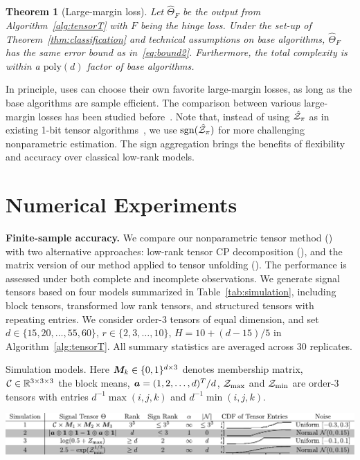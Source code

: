 \documentclass{article}
\theoremstyle{plain}
\newtheorem{thm}{Theorem}
\theoremstyle{definition}
\def\sign{\textup{sgn}}
\def\CPT{\text{\bf \footnotesize CPT}}
\def\NonParaM{\text{\bf \footnotesize NonparaM}}
\def\NonParaT{\text{\bf \footnotesize NonparaT}}
\begin{document}
\begin{thm}[Large-margin loss] Let $\hat \Theta_F$ be the output from Algorithm~\ref{alg:tensorT} with $F$ being the hinge loss. Under the set-up of Theorem~\ref{thm:classification} and technical assumptions on base algorithms, $\hat \Theta_F$ has the same error bound as in~\eqref{eq:bound2}. Furthermore, the total complexity is within a $\text{poly}(d)$ factor of base algorithms. 
\end{thm}
In principle, uses can choose their own favorite large-margin losses, as long as the base algorithms are sample efficient. The comparison between various large-margin losses has been studied before~\cite{bartlett2006convexity}. Note that, instead of using $\hat {\mathcal{Z}}_\pi$ as in existing 1-bit tensor algorithms~\cite{ghadermarzy2018learning,wang2018learning}, we use $\sign(\hat \tZ_\pi)$ for more challenging nonparametric estimation. The sign aggregation brings the benefits of flexibility and accuracy over classical low-rank models. 

\vspace{-.1cm}
\section{Numerical Experiments}\label{sec:simulation}
\vspace{-.2cm}

{\bf Finite-sample accuracy.} We compare our nonparametric tensor method (\NonParaT) with two alternative approaches: low-rank tensor CP decomposition (\CPT), and the matrix version of our method applied to tensor unfolding (\NonParaM). The performance is assessed under both complete and incomplete observations.  We generate signal tensors based on four models summarized in Table~\ref{tab:simulation}, including block tensors, transformed low rank tensors, and structured tensors with repeating entries. We consider order-3  tensors of equal dimension, and set $d\in \{15, 20,\ldots,55,60\}$, $r\in\{2,3,\ldots,10\}$, $H=10+{(d-15)/ 5}$ in Algorithm~\ref{alg:tensorT}. All summary statistics are averaged across $30$ replicates. 

\vspace{-.3cm}
\begin{table}[h]
\captionsetup{font=footnotesize}
\caption{Simulation models. Here $\bm M_k\in\{0,1\}^{d\times 3}$ denotes membership matrix, $\mathcal{C}\in\mathbb{R}^{3\times 3\times 3}$ the block means, $\bm{a}=(1,2,\ldots,d)^T/d$, $\mathcal{Z}_{\max}$ and $\mathcal{Z}_{\min}$ are order-3 tensors with entries $d^{-1}\max(i,j,k)$ and $d^{-1}\min(i,j,k)$.}\label{tab:simulation}
\vspace{.1cm}
\includegraphics[width=\textwidth]{figure/simulation2.pdf}
\end{table}
\vspace{-.1cm}
\end{document}

